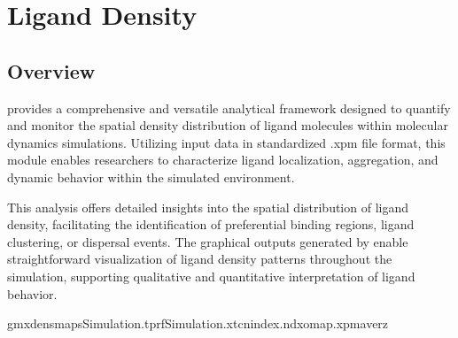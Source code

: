 \documentclass[a4paper,10pt,english]{sphinxmanual}
\begin{document}
\begin{sphinxVerbatim}[commandchars=\\\{\}]
 
   \PYG{p}{[}\PYG{p}{]}
 
\end{sphinxVerbatim}

\sphinxstepscope


\chapter{Ligand Density}
\label{\detokenize{Ligand Density:ligand-density}}\label{\detokenize{Ligand Density::doc}}

\section{Overview}
\label{\detokenize{Ligand Density:overview}}
\sphinxAtStartPar
{} provides a comprehensive and versatile analytical framework designed to quantify and monitor the spatial density distribution of ligand molecules within molecular dynamics simulations. Utilizing input data in standardized .xpm file format, this module enables researchers to characterize ligand localization, aggregation, and dynamic behavior within the simulated environment.

\sphinxAtStartPar
This analysis offers detailed insights into the spatial distribution of ligand density, facilitating the identification of preferential binding regions, ligand clustering, or dispersal events. The graphical outputs generated by  enable straightforward visualization of ligand density patterns throughout the simulation, supporting qualitative and quantitative interpretation of ligand behavior.

\sphinxAtStartPar
{}

\begin{sphinxVerbatim}[commandchars=\\\{\}]
gmxdensmap\PYGZhy{}sSimulation.tpr\PYGZhy{}fSimulation.xtc\PYGZhy{}nindex.ndx\PYGZhy{}omap.xpm\PYGZhy{}averz
\end{sphinxVerbatim}
\end{document}
